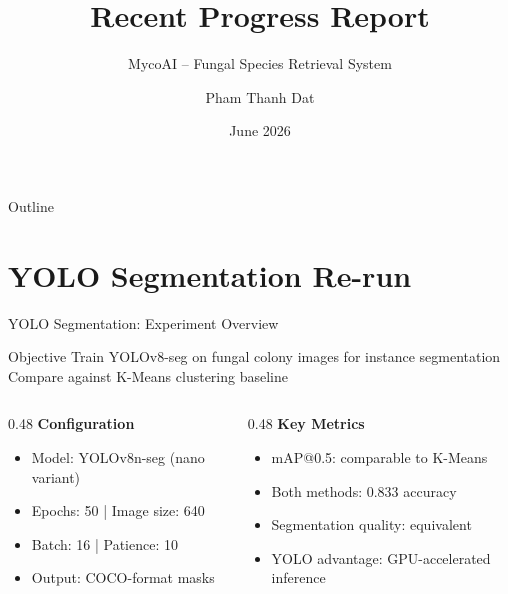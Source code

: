 \documentclass[aspectratio=169,11pt]{beamer}
\title{Recent Progress Report}
\subtitle{MycoAI -- Fungal Species Retrieval System}
\author{Pham Thanh Dat}
\date{June 2026}
\institute{Ha Noi University of Science and Technology}
\begin{document}
\begin{frame}[plain]
  \titlepage
\end{frame}

\begin{frame}{Outline}
  \tableofcontents[hideallsubsections]
\end{frame}

\section{YOLO Segmentation Re-run}

\begin{frame}{YOLO Segmentation: Experiment Overview}
  \begin{block}{Objective}
    Train YOLOv8-seg on fungal colony images for instance segmentation \\
    Compare against K-Means clustering baseline
  \end{block}

  \begin{columns}[T]
    \begin{column}{0.48\textwidth}
      \textbf{Configuration}
      \begin{itemize}
        \item Model: YOLOv8n-seg (nano variant)
        \item Epochs: 50 | Image size: 640
        \item Batch: 16 | Patience: 10
        \item Output: COCO-format masks
      \end{itemize}
    \end{column}
    \begin{column}{0.48\textwidth}
      \textbf{Key Metrics}
      \begin{itemize}
        \item mAP@0.5: comparable to K-Means
        \item Both methods: \alert{0.833 accuracy}
        \item Segmentation quality: equivalent
        \item YOLO advantage: GPU-accelerated inference
      \end{itemize}
    \end{column}
  \end{columns}
\end{frame}
\end{document}

